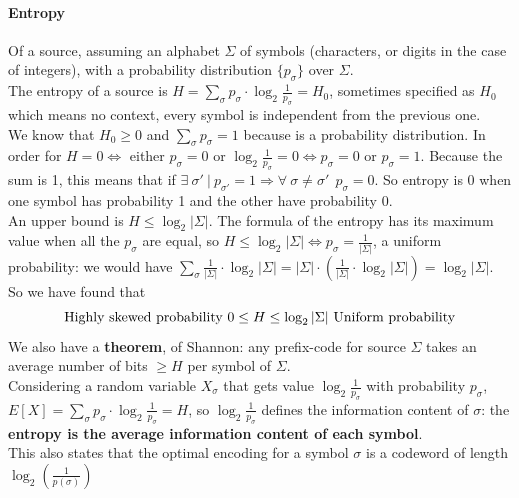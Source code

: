 \documentclass[10pt]{report}
\begin{document}
\paragraph{Entropy} Of a source, assuming an alphabet $\Sigma$ of symbols (characters, or digits in the case of integers), with a probability distribution $\{p_\sigma\}$ over $\Sigma$.\\
The entropy of a source is $H = \sum_\sigma p_\sigma\cdot\log_2 \frac{1}{p_\sigma} = H_0$, sometimes specified as $H_0$ which means no context, every symbol is independent from the previous one.\\
We know that $H_0 \geq 0$ and $\sum_\sigma p_\sigma = 1$ because is a probability distribution. In order for $H = 0 \Leftrightarrow$ either $p_\sigma = 0$ or $\log_2\frac{1}{p_\sigma} = 0 \Leftrightarrow p_\sigma = 0$ or $p_\sigma = 1$. Because the sum is 1, this means that if $\exists\:\sigma'\:|\:p_{\sigma'}=1 \Rightarrow \forall\:\sigma\neq\sigma'\:\:p_\sigma = 0$. So entropy is $0$ when one symbol has probability 1 and the other have probability $0$.\\
An upper bound is $H \leq \log_2 |\Sigma|$. The formula of the entropy has its maximum value when all the $p_\sigma$ are equal, so $H \leq \log_2 |\Sigma| \Leftrightarrow p_\sigma = \frac{1}{|\Sigma|}$, a uniform probability: we would have $\sum_\sigma \frac{1}{|\Sigma|}\cdot\log_2|\Sigma| = |\Sigma|\cdot\left(\frac{1}{|\Sigma|}\cdot\log_2|\Sigma|\right) = \log_2|\Sigma|$. So we have found that $$\hbox{Highly skewed probability }0 \leq H \leq \log_2 |\Sigma|\hbox{ Uniform probability}$$
We also have a \textbf{theorem}, of Shannon: any prefix-code for source $\Sigma$ takes an average number of bits $\geq H$ per symbol of $\Sigma$.\\
Considering a random variable $X_\sigma$ that gets value $\log_2 \frac{1}{p_\sigma}$ with probability $p_\sigma$, $E[X] = \sum_\sigma p_\sigma\cdot\log_2\frac{1}{p_\sigma} = H$, so $\log_2 \frac{1}{p_\sigma}$ defines the information content of $\sigma$: the \textbf{entropy is the average information content of each symbol}.\\
This also states that the optimal encoding for a symbol $\sigma$ is a codeword of length $\log_2\left(\frac{1}{p(\sigma)}\right)$
\end{document}
